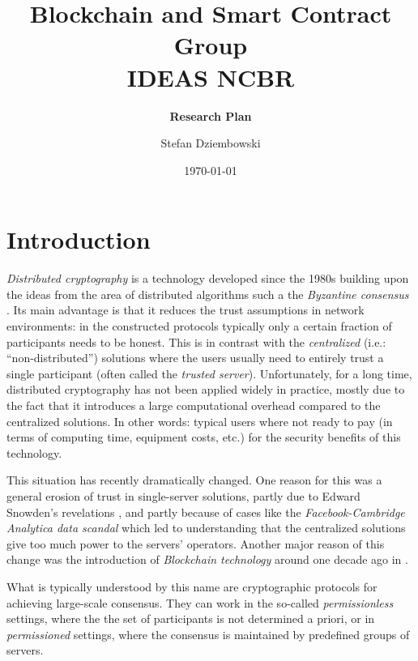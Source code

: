 \documentclass{article}
\title{\textbf{Blockchain and Smart Contract Group\\ IDEAS NCBR}}
\subtitle{\textbf{Research Plan}}
\date{\today}
\author{Stefan Dziembowski}
\begin{document}
	
\maketitle

\section{Introduction}


\emph{Distributed cryptography} is a technology developed since the 1980s \cite{DBLP:conf/focs/Yao86,DBLP:conf/stoc/GoldreichMW87,DBLP:conf/crypto/ChaumCD87,DBLP:conf/stoc/Ben-OrGW88} building upon the ideas from the area of distributed algorithms such a the \emph{Byzantine consensus} \cite{DBLP:journals/toplas/LamportSP82}.  Its main advantage is that it reduces the trust assumptions in network environments: in the constructed protocols typically only a certain fraction of participants needs to be honest. This is in contrast with the \emph{centralized} (i.e.: ``non-distributed'') solutions where the users usually need to entirely trust a single participant (often called the \emph{trusted server}). Unfortunately, for a long time, distributed cryptography has not been applied  widely in practice, mostly due to the fact that it introduces a large computational overhead compared to the centralized solutions. In other words: typical users where not ready to pay (in terms of computing time, equipment costs, etc.) for the security benefits of this technology.

This situation has  recently dramatically changed. One reason for this was a general erosion of trust in single-server solutions, partly due to Edward Snowden's revelations \cite{enwiki:1029775076}, and partly because of cases like the \emph{Facebook-Cambridge Analytica data scandal} \cite{enwiki:1029165846} which led to understanding that the centralized solutions give too much power to the servers' operators. Another major reason of this change was the introduction of \emph{Blockchain technology} around one decade ago in \cite{nakamoto2008bitcoin}. 

What is typically understood by this name are cryptographic protocols for achieving large-scale consensus. They can work in the so-called \emph{permissionless} settings, where the the set of participants is not determined a priori, or in \emph{permissioned} settings, where the consensus is maintained by predefined groups of servers. 
\end{document}
